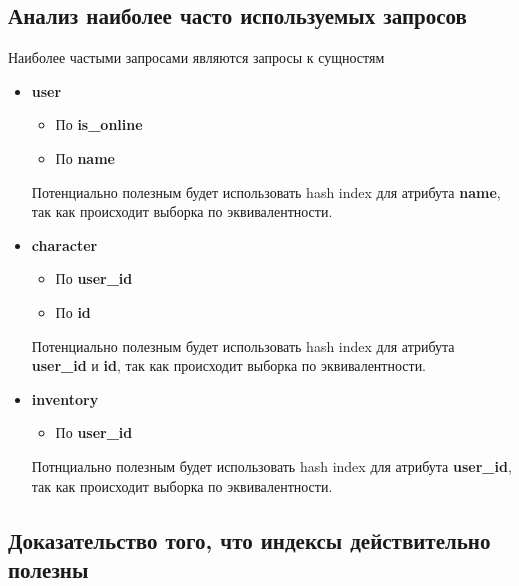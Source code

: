 \newpage

\subsection*{Анализ наиболее часто используемых запросов}


Наиболее частыми запросами являются запросы к сущностям 
\begin{itemize}
    \item \textbf{user}
    \begin{itemize}

        \item По \textbf{is\_online}
        \item По \textbf{name}
    \end{itemize}
    Потенциально полезным будет использовать hash index для атрибута \textbf{name}, так как происходит выборка по эквивалентности.

    
    \item \textbf{character}
    \begin{itemize}
        \item По \textbf{user\_id}
        \item По \textbf{id}
    \end{itemize}

    Потенциально полезным будет использовать hash index для атрибута \textbf{user\_id} и \textbf{id}, так как происходит выборка по эквивалентности.

    \item \textbf{inventory}
    \begin{itemize}
        \item По \textbf{user\_id}
    \end{itemize}

    Потнциально полезным будет использовать hash index для атрибута \textbf{user\_id}, так как происходит выборка по эквивалентности.
\end{itemize}

\newpage

\subsection*{Доказательство того, что индексы действительно полезны}


